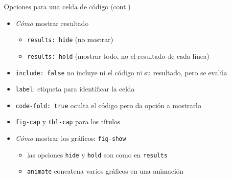 \documentclass[
  10pt,
  ignorenonframetext,
]{beamer}
\providecommand{\tightlist}{%
  \setlength{\itemsep}{0pt}\setlength{\parskip}{0pt}}\usepackage{longtable,booktabs,array}
\begin{document}
\begin{frame}[fragile]{Opciones para una celda de código (cont.)}
\label{opciones-para-una-celda-de-cuxf3digo-cont.}
\begin{itemize}
\item
  \emph{Cómo} mostrar resultado

  \begin{itemize}
  \tightlist
  \item
    \texttt{results:\ hide} (no mostrar)
  \item
    \texttt{results:\ hold} (mostrar todo, no el resultado de cada
    línea)
  \end{itemize}
\item
  \texttt{include:\ false} no incluye ni el código ni su resultado, pero
  se evalúa
\item
  \texttt{label}: etiqueta para identificar la celda
\item
  \texttt{code-fold:\ true} oculta el código pero da opción a mostrarlo
\end{itemize}

\begin{itemize}
\item
  \texttt{fig-cap} y \texttt{tbl-cap} para los títulos
\item
  \emph{Cómo} mostrar los gráficos: \texttt{fig-show}

  \begin{itemize}
  \tightlist
  \item
    las opciones \texttt{hide} y \texttt{hold} son como en
    \texttt{results}
  \item
    \texttt{animate} concatena varios gráficos en una animación
  \end{itemize}
\end{itemize}
\end{frame}
\end{document}
